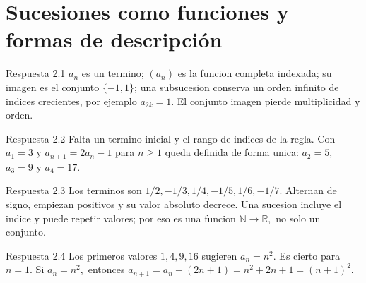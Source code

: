 \documentclass[10pt,a4paper,oneside,openany]{book}
\begin{document}
\section{Sucesiones como funciones y formas de descripción}
\begin{PSevenAnswerFixed}{Respuesta 2.1}
\(a_n\) es un termino; \((a_n)\) es la funcion completa indexada; su imagen es el conjunto \(\{-1,1\}\); una subsucesion conserva un orden infinito de indices crecientes, por ejemplo \(a_{2k}=1\). El conjunto imagen pierde multiplicidad y orden.
\end{PSevenAnswerFixed}
\begin{PSevenAnswerFixed}{Respuesta 2.2}
Falta un termino inicial y el rango de indices de la regla. Con \(a_1=3\) y \(a_{n+1}=2a_n-1\) para \(n\ge 1\) queda definida de forma unica: \(a_2=5,\) \(a_3=9\) y \(a_4=17\).
\end{PSevenAnswerFixed}
\begin{PSevenAnswerFixed}{Respuesta 2.3}
Los terminos son \(1/2,-1/3,1/4,-1/5,1/6,-1/7\). Alternan de signo, empiezan positivos y su valor absoluto decrece. Una sucesion incluye el indice y puede repetir valores; por eso es una funcion \(\mathbb{N}\to \mathbb{R},\) no solo un conjunto.
\end{PSevenAnswerFixed}
\begin{PSevenAnswerFixed}{Respuesta 2.4}
Los primeros valores \(1,4,9,16\) sugieren \(a_n=n^{2}\). Es cierto para \(n=1\). Si \(a_n=n^{2},\) entonces \(a_{n+1}=a_n+(2n+1)=n^{2}+2n+1=(n+1)^{2}\).
\end{PSevenAnswerFixed}
\end{document}
